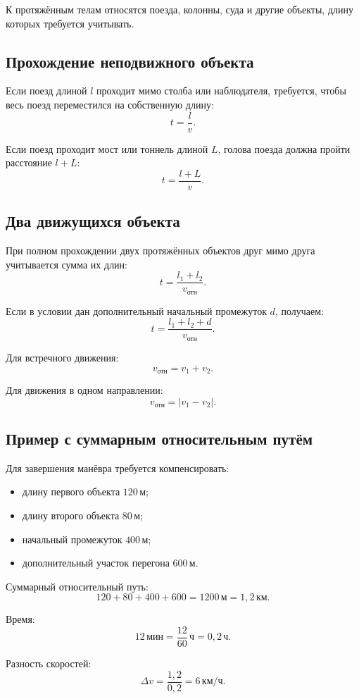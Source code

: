 \documentclass[a4paper,12pt]{article}
\newcommand{\unit}[1]{\,\text{#1}}
\begin{document}
К протяжённым телам относятся поезда, колонны, суда и другие объекты,
длину которых требуется учитывать.

\subsection{Прохождение неподвижного объекта}

Если поезд длиной $l$ проходит мимо столба или наблюдателя, требуется,
чтобы весь поезд переместился на собственную длину:
\[
t=\frac{l}{v}.
\]

Если поезд проходит мост или тоннель длиной $L$, голова поезда должна пройти
расстояние $l+L$:
\[
t=\frac{l+L}{v}.
\]

\subsection{Два движущихся объекта}

При полном прохождении двух протяжённых объектов друг мимо друга
учитывается сумма их длин:
\[
t
=
\frac{l_1+l_2}{v_{\text{отн}}}.
\]

Если в условии дан дополнительный начальный промежуток $d$, получаем:
\[
t
=
\frac{l_1+l_2+d}{v_{\text{отн}}}.
\]

Для встречного движения:
\[
v_{\text{отн}}=v_1+v_2.
\]

Для движения в одном направлении:
\[
v_{\text{отн}}=|v_1-v_2|.
\]

\subsection{Пример с суммарным относительным путём}

Для завершения манёвра требуется компенсировать:

\begin{itemize}
  \item длину первого объекта $120\unit{м}$;
  \item длину второго объекта $80\unit{м}$;
  \item начальный промежуток $400\unit{м}$;
  \item дополнительный участок перегона $600\unit{м}$.
\end{itemize}

Суммарный относительный путь:
\[
120+80+400+600
=
1200\unit{м}
=
1{,}2\unit{км}.
\]

Время:
\[
12\unit{мин}
=
\frac{12}{60}\unit{ч}
=
0{,}2\unit{ч}.
\]

Разность скоростей:
\[
\Delta v
=
\frac{1{,}2}{0{,}2}
=
6\unit{км/ч}.
\]
\end{document}
